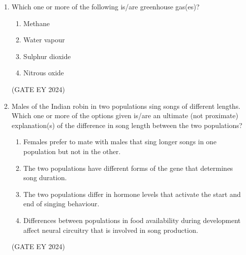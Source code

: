 \documentclass[journal]{IEEEtran}
\begin{document}
\begin{enumerate}
\item Which one or more of the following is/are greenhouse gas(es)?
    \begin{multicols}{2}
    \begin{enumerate}
        \item Methane
        \item Water vapour
        \item Sulphur dioxide
        \item Nitrous oxide
    \end{enumerate}
    \end{multicols}
\hfill{(GATE EY 2024)}

\item Males of the Indian robin in two populations sing songs of different lengths. Which one or more of the options given is/are an ultimate (not proximate) explanation(s) of the difference in song length between the two populations?
    \begin{enumerate}
        \item Females prefer to mate with males that sing longer songs in one population but not in the other.
        \item The two populations have different forms of the gene that determines song duration.
        \item The two populations differ in hormone levels that activate the start and end of singing behaviour.
        \item Differences between populations in food availability during development affect neural circuitry that is involved in song production.
    \end{enumerate}
\hfill{(GATE EY 2024)}


\end{enumerate}
\end{document}
